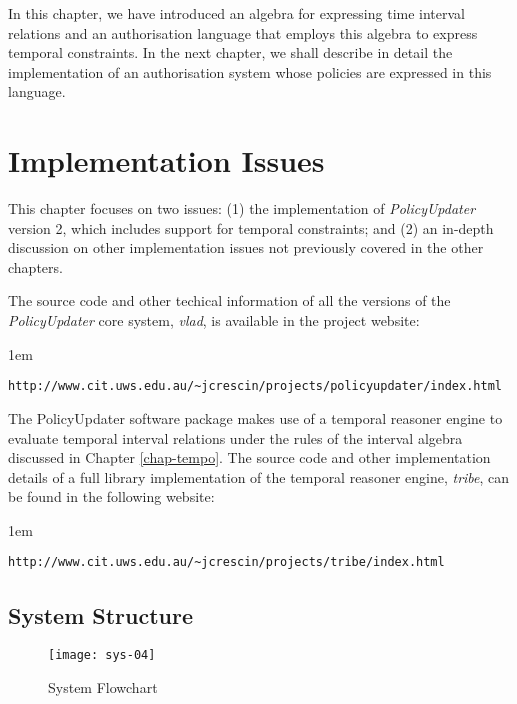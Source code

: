 \documentclass[11pt]{report}
\newenvironment{vquote}
{
  \begin{list}{}{\leftmargin 1em}\item[]
}
{
  \end{list}
}
\begin{document}
      In this chapter, we have introduced an algebra for expressing time
      interval relations and an authorisation language that employs this
      algebra to express temporal constraints. In the next chapter, we shall
      describe in detail the implementation of an authorisation system whose
      policies are expressed in this language.

  \chapter{Implementation Issues}
    \label{chap-impln}

    This chapter focuses on two issues: (1) the implementation of
    {\em PolicyUpdater} version 2, which includes support for temporal
    constraints; and (2) an in-depth discussion on other implementation issues
    not previously covered in the other chapters.

    The source code and other techical information of all the versions of
    the {\em PolicyUpdater} core system, {\em vlad}, is available in the
    project website:

    \begin{vquote}
      {\tt\scriptsize http://www.cit.uws.edu.au/\~{}jcrescin/projects/policyupdater/index.html}
    \end{vquote}

    The PolicyUpdater software package makes use of a temporal reasoner engine
    to evaluate temporal interval relations under the rules of the interval
    algebra discussed in Chapter \ref{chap-tempo}. The source code and other
    implementation details of a full library implementation of the temporal
    reasoner engine, {\em tribe}, can be found in the following website:

    \begin{vquote}
      {\tt\scriptsize http://www.cit.uws.edu.au/\~{}jcrescin/projects/tribe/index.html}
    \end{vquote}

    \section{System Structure}
      \label{sect-impln-sysst}

      \begin{figure}[tbhp]
        \begin{center}
          \texttt{[image: sys-04]}
          \caption{System Flowchart}
          \label{figu-impln-flwch}
        \end{center}
      \end{figure}
\end{document}
